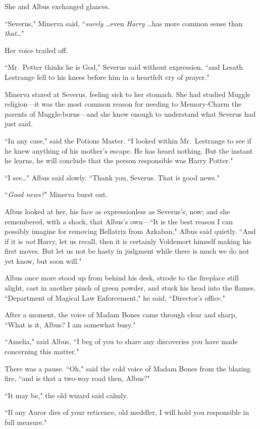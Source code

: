 She and Albus exchanged glances.

``Severus," Minerva said, ``\emph{surely} {\ldots}even \emph{Harry} {\ldots}has more common sense than \emph{that{\ldots}}"

Her voice trailed off.

``Mr.~Potter thinks he is God," Severus said without expression, ``and Lesath Lestrange fell to his knees before him in a heartfelt cry of prayer."

Minerva stared at Severus, feeling sick to her stomach. She had studied Muggle religion---it was the most common reason for needing to Memory-Charm the parents of Muggle-borns---and she knew enough to understand what Severus had just said.

``In any case," said the Potions Master. ``I looked within Mr.~Lestrange to see if he knew anything of his mother's escape. He has heard nothing. But the instant he learns, he will conclude that the person responsible was Harry Potter."

``I see{\ldots}" Albus said slowly. ``Thank you, Severus. That is good news."

``\emph{Good news?}" Minerva burst out.

Albus looked at her, his face as expressionless as Severus's, now; and she remembered, with a shock, that Albus's own---``It is the best reason I can possibly imagine for removing Bellatrix from Azkaban," Albus said quietly. ``And if it is \emph{not} Harry, let us recall, then it is certainly Voldemort himself making his first moves. But let us not be hasty in judgment while there is much we do not yet know, but soon will."

Albus once more stood up from behind his desk, strode to the fireplace still alight, cast in another pinch of green powder, and stuck his head into the flames. ``Department of Magical Law Enforcement," he said, ``Director's office."

After a moment, the voice of Madam Bones came through clear and sharp, ``What is it, Albus? I am somewhat busy."

``Amelia," said Albus, ``I beg of you to share any discoveries you have made concerning this matter."

There was a pause. ``Oh," said the cold voice of Madam Bones from the blazing fire, ``and is that a two-way road then, Albus?"

``It may be," the old wizard said calmly.

``If any Auror dies of your reticence, old meddler, I will hold you responsible in full measure."

